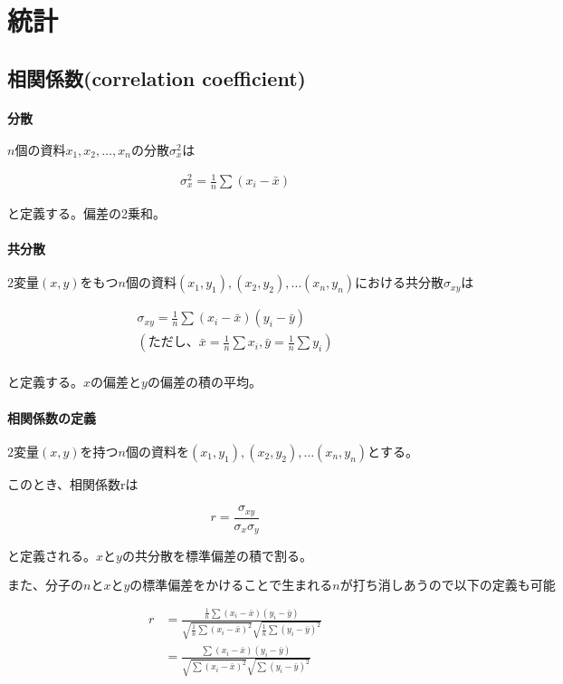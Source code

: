 \documentclass{jlreq}
\begin{document}
\fi
\section{統計}

\subsection{相関係数(correlation coefficient)}

\paragraph{分散}
$n個の資料x_1, x_2, \dots, x_nの分散\sigma_{x}^{2}は$

\begin{gather*}
    \sigma_{x}^2 = \frac{1}{n} \sum (x_i - \bar{x})
\end{gather*}

と定義する。偏差の2乗和。

\paragraph{共分散}

$2変量(x,y)をもつn個の資料(x_1, y_1), (x_2, y_2), \dots (x_n, y_n)における共分散 \sigma_{xy}は$

\begin{gather*}
    \sigma_{xy} = \frac{1}{n} \sum (x_i - \bar{x}) (y_i - \bar{y})\\
    (ただし、\bar{x} = \frac{1}{n} \sum x_i, \bar{y} = \frac{1}{n} \sum y_i)\\
\end{gather*}

と定義する。$xの偏差とyの偏差の積の平均。$

\paragraph{相関係数の定義}

$2変量(x,y)を持つn個の資料を(x_1,y_1), (x_2, y_2), \dots (x_n, y_n)とする。$

このとき、相関係数rは

\[r = \frac{\sigma_{xy}}{\sigma_x \sigma_y}\]

と定義される。$xとyの共分散を標準偏差の積で割る。$

$また、分子のnとxとyの標準偏差をかけることで生まれるnが打ち消しあうので以下の定義も可能$

\begin{align*}
    r &= \frac
        {\frac{1}{n} \sum (x_i - \bar{x})(y_i - \bar{y}) }
        {\sqrt{\frac{1}{n} \sum (x_i - \bar{x})^2} \sqrt{\frac{1}{n} \sum (y_i - \bar{y})^2}} \\
      &= \frac
        {\sum (x_i - \bar{x})(y_i - \bar{y})}
        {\sqrt{\sum (x_i - \bar{x})^2} \sqrt{\sum (y_i - \bar{y})^2}}
\end{align*}
\end{document}
